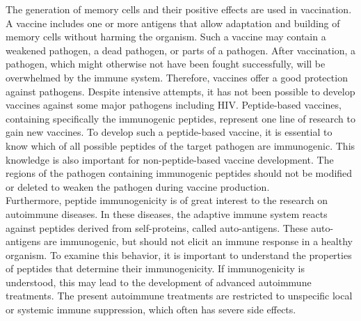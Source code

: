 The generation of memory cells and their positive effects are used in vaccination. A vaccine includes one or more antigens that allow adaptation and building of memory cells without harming the organism. Such a vaccine may contain a weakened pathogen, a dead pathogen, or parts of a pathogen. After vaccination, a pathogen, which might otherwise not have been fought successfully, will be overwhelmed by the immune system. Therefore, vaccines offer a good protection against pathogens. Despite intensive attempts, it has not been possible to develop vaccines against some major pathogens including HIV. Peptide-based vaccines, containing specifically the immunogenic peptides, represent one line of research to gain new vaccines. To develop such a peptide-based vaccine, it is essential to know which of all possible peptides of the target pathogen are immunogenic. This knowledge is also important for non-peptide-based vaccine development. The regions of the pathogen containing immunogenic peptides should not be modified or deleted to weaken the pathogen during vaccine production.\\
Furthermore, peptide immunogenicity is of great interest to the research on autoimmune diseases. In these diseases, the adaptive immune system reacts against peptides derived from self-proteins, called auto-antigens. These auto-antigens are immunogenic, but should not elicit an immune response in a healthy organism. To examine this behavior, it is important to understand the properties of peptides that determine their immunogenicity. If immunogenicity is understood, this may lead to the development of advanced autoimmune treatments. The present autoimmune treatments are restricted to unspecific local or systemic immune suppression, which often has severe side effects.\\
